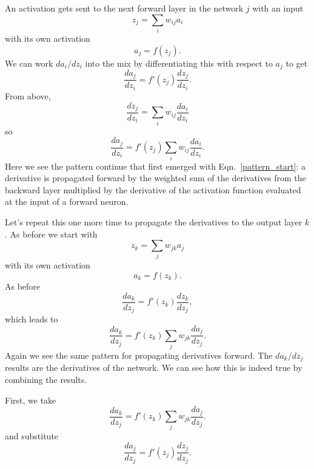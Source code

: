\documentclass[12pt]{article}
\begin{document}
An activation gets sent to the next forward layer in the network $j$ with an input
\begin{equation}
z_j=\sum_i w_{ij}a_i
\end{equation}
with its own activation
\begin{equation}
a_j=f(z_j).
\end{equation}
We can work $da_i/dz_i$ into the mix by differentiating this with respect to $a_j$ to get
\begin{equation}
\frac{da_j}{dz_i}=f'(z_j)\frac{dz_j}{dz_i}.
\end{equation}
From above,
\begin{equation}
\frac{dz_j}{dz_i}=\sum_i w_{ij}\frac{da_i}{dz_i}
\end{equation}
so
\begin{equation}
\frac{da_j}{dz_i}=f'(z_j)\sum_i w_{ij}\frac{da_i}{dz_i}.
\end{equation}
Here we see the pattern continue that first emerged with Eqn.~\ref{pattern_start}: a derivative is propagated forward by the weighted sum of the derivatives from the backward layer multiplied by the derivative of the activation function evaluated at the input of a forward neuron.

Let's repeat this one more time to propagate the derivatives to the output layer $k$.  As before we start with
\begin{equation}
z_k=\sum_j w_{jk}a_j
\end{equation}
with its own activation
\begin{equation}
a_k=f(z_k).
\end{equation}
As before
\begin{equation}
\frac{da_k}{dz_j}=f'(z_k)\frac{dz_k}{dz_j},
\end{equation}
which leads to
\begin{equation}
\frac{da_k}{dz_j}=f'(z_k)\sum_j w_{jk}\frac{da_j}{dz_j}.
\end{equation}
Again we see the same pattern for propagating derivatives forward. The $da_k/dz_j$ results are the derivatives of the network.  We can see how this is indeed true by combining the results.

First, we take
\begin{equation}
\frac{da_k}{dz_j}=f'(z_k)\sum_j w_{jk}\frac{da_j}{dz_j}.
\end{equation}
and substitute 
\begin{equation}
\frac{da_j}{dz_j}=f'(z_j)\frac{dz_j}{dz_j}.
\end{equation}
\end{document}
